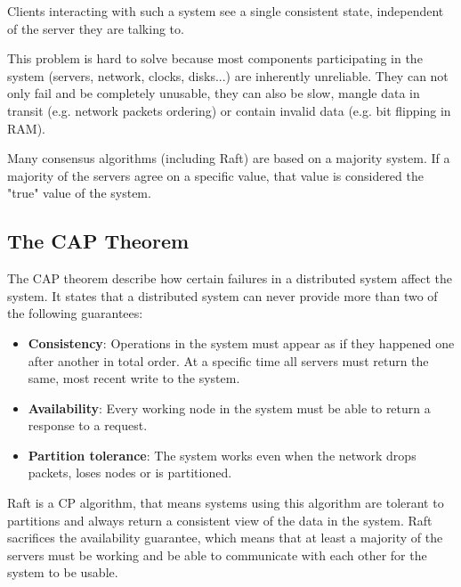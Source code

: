 Clients interacting with such a system see a single consistent state, independent of the server they are talking to.

This problem is hard to solve because most components participating in the system (servers, network, clocks, disks...) are inherently unreliable. They can not only fail and be completely unusable, they can also be slow, mangle data in transit (e.g. network packets ordering) or contain invalid data (e.g. bit flipping in RAM).

Many consensus algorithms (including Raft) are based on a majority system. If a majority of the servers agree on a specific value, that value is considered the "true" value of the system.

\subsection{The CAP Theorem}
The CAP theorem describe how certain failures in a distributed system affect the system. It states that a distributed system can never provide more than two of the following guarantees: \cite{cap_theorem}

\begin{itemize}
  \item \textbf{Consistency}: Operations in the system must appear as if they happened one after another in total order. At a specific time all servers must return the same, most recent write to the system.
  \item \textbf{Availability}: Every working node in the system must be able to return a response to a request.
  \item \textbf{Partition tolerance}: The system works even when the network drops packets, loses nodes or is partitioned.
\end{itemize}

Raft is a CP algorithm, that means systems using this algorithm are tolerant to partitions and always return a consistent view of the data in the system. Raft sacrifices the availability guarantee, which means that at least a majority of the servers must be working and be able to communicate with each other for the system to be usable.


